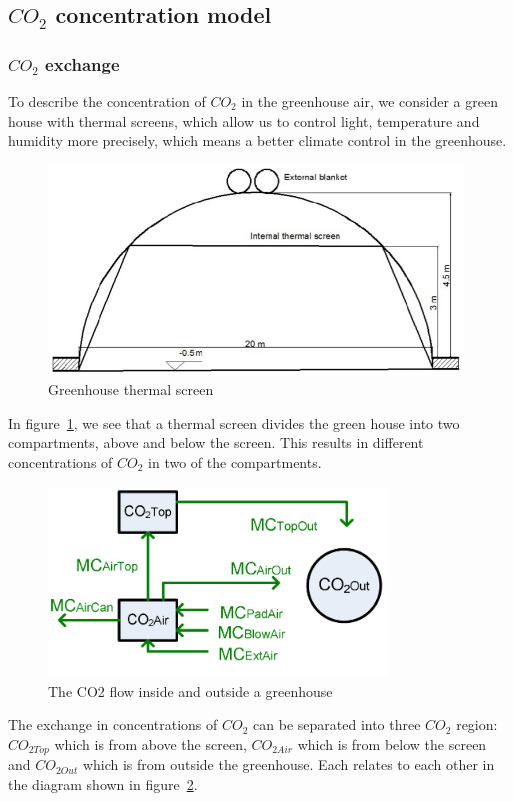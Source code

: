 \documentclass[a4paper]{article}
\begin{document}
\subsection{\(CO_2\) concentration model}
\subsubsection{\(CO_2\) exchange}
To describe the concentration of \(CO_2\) in the greenhouse air, we consider a green house with thermal screens, which allow us to control light, temperature and humidity more precisely, which means a better climate control in the greenhouse.
\begin{figure}[H]
  \centering
  \includegraphics[width=11cm]{thrscr.png}
  \caption{Greenhouse thermal screen}\label{fig:thrscr}
\end{figure}

In figure~\ref{fig:thrscr}, we see that a thermal screen divides the green house into two compartments, above and below the screen.
This results in different concentrations of \(CO_2\) in two of the compartments.
\begin{figure}[H]
  \centering
  \includegraphics[width=9cm]{CO2}
  \caption{The CO2 flow inside and outside a greenhouse}\label{fig:CO2}
\end{figure}

The exchange in concentrations of \(CO_2\) can be separated into three \(CO_2\) region: \(CO_{2Top}\) which is from above the screen, \(CO_{2Air}\) which is from below the screen and \(CO_{2Out}\) which is from outside the greenhouse.
Each relates to each other in the diagram shown in figure~\ref{fig:CO2}.
\end{document}
